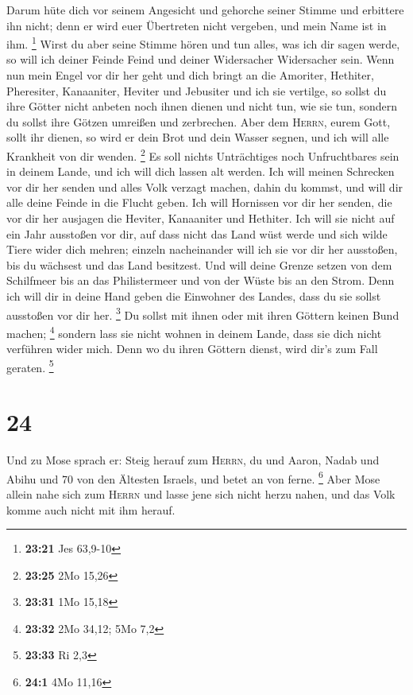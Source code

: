  Darum hüte dich vor seinem Angesicht und gehorche seiner
Stimme und erbittere ihn nicht; denn er wird euer Übertreten nicht
vergeben, und mein Name ist in ihm. \footnote{\textbf{23:21} Jes 63,9-10}
 Wirst du aber seine Stimme hören und tun alles, was ich
dir sagen werde, so will ich deiner Feinde Feind und deiner Widersacher
Widersacher sein.  Wenn nun mein Engel vor dir her geht
und dich bringt an die Amoriter, Hethiter, Pheresiter, Kanaaniter,
Heviter und Jebusiter und ich sie vertilge,  so sollst du
ihre Götter nicht anbeten noch ihnen dienen und nicht tun, wie sie tun,
sondern du sollst ihre Götzen umreißen und zerbrechen. 
Aber dem \textsc{Herrn}, eurem Gott, sollt ihr dienen, so wird er dein
Brot und dein Wasser segnen, und ich will alle Krankheit von dir wenden.
\footnote{\textbf{23:25} 2Mo 15,26}  Es soll nichts
Unträchtiges noch Unfruchtbares sein in deinem Lande, und ich will dich
lassen alt werden.  Ich will meinen Schrecken vor dir her
senden und alles Volk verzagt machen, dahin du kommst, und will dir alle
deine Feinde in die Flucht geben.  Ich will Hornissen vor
dir her senden, die vor dir her ausjagen die Heviter, Kanaaniter und
Hethiter.  Ich will sie nicht auf ein Jahr ausstoßen vor
dir, auf dass nicht das Land wüst werde und sich wilde Tiere wider dich
mehren;  einzeln nacheinander will ich sie vor dir her
ausstoßen, bis du wächsest und das Land besitzest.  Und
will deine Grenze setzen von dem Schilfmeer bis an das Philistermeer und
von der Wüste bis an den Strom. Denn ich will dir in deine Hand geben
die Einwohner des Landes, dass du sie sollst ausstoßen vor dir her.
\footnote{\textbf{23:31} 1Mo 15,18}  Du sollst mit ihnen
oder mit ihren Göttern keinen Bund machen; \footnote{\textbf{23:32} 2Mo
  34,12; 5Mo 7,2}  sondern lass sie nicht wohnen in
deinem Lande, dass sie dich nicht verführen wider mich. Denn wo du ihren
Göttern dienst, wird dir's zum Fall geraten. \footnote{\textbf{23:33} Ri
  2,3}

\hypertarget{section-5}{%
\section{24}\label{section-5}}

 Und zu Mose sprach er: Steig herauf zum \textsc{Herrn},
du und Aaron, Nadab und Abihu und 70 von den Ältesten Israels, und betet
an von ferne. \footnote{\textbf{24:1} 4Mo 11,16}  Aber
Mose allein nahe sich zum \textsc{Herrn} und lasse jene sich nicht herzu
nahen, und das Volk komme auch nicht mit ihm herauf.

